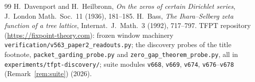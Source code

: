 \documentclass[11pt,a4paper]{article}
\theoremstyle{remark}
\begin{document}
\begin{thebibliography}{99}
 H.~Davenport and H.~Heilbronn,
\emph{On the zeros of certain Dirichlet series},
J.\ London Math.\ Soc.\ 11 (1936), 181--185.
 H.~Bass,
\emph{The Ihara--Selberg zeta function of a tree lattice},
Internat.\ J.\ Math.\ 3 (1992), 717--797.
 TFPT repository
(\url{https://fixpoint-theory.com}): frozen window machinery
\texttt{verification/v563\_paper2\_readouts.py}; the discovery probes
of the title footnote, \texttt{packet\_garding\_probe.py} and
\texttt{zero\_gap\_theorem\_probe.py}, all in
\texttt{experiments/tfpt-discovery/}; suite modules \texttt{v668},
\texttt{v669}, \texttt{v674}, \texttt{v676}--\texttt{v678}
(Remark~\ref{rem:suite}) (2026).
\end{thebibliography}
\end{document}
